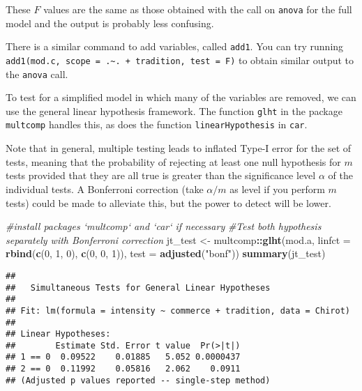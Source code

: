 \documentclass[]{book}
\newenvironment{Shaded}{\begin{snugshade}}{\end{snugshade}}
\newcommand{\CommentTok}[1]{\textcolor[rgb]{0.56,0.35,0.01}{\textit{#1}}}
\newcommand{\DataTypeTok}[1]{\textcolor[rgb]{0.13,0.29,0.53}{#1}}
\newcommand{\DecValTok}[1]{\textcolor[rgb]{0.00,0.00,0.81}{#1}}
\newcommand{\KeywordTok}[1]{\textcolor[rgb]{0.13,0.29,0.53}{\textbf{#1}}}
\newcommand{\NormalTok}[1]{#1}
\newcommand{\OperatorTok}[1]{\textcolor[rgb]{0.81,0.36,0.00}{\textbf{#1}}}
\newcommand{\StringTok}[1]{\textcolor[rgb]{0.31,0.60,0.02}{#1}}
\theoremstyle{definition}
\theoremstyle{definition}
\theoremstyle{definition}
\theoremstyle{remark}
\begin{document}
These \(F\) values are the same as those obtained with the call on \texttt{anova} for the full model and the output is probably less confusing.

There is a similar command to add variables, called \texttt{add1}. You can try running \texttt{add1(mod.c,\ scope\ =\ .\textasciitilde{}.\ +\ tradition,\ test\ =\ \textquotesingle{}F\textquotesingle{})} to obtain similar output to the \texttt{anova} call.

To test for a simplified model in which many of the variables are removed, we can use the general linear hypothesis framework. The function \texttt{glht} in the package \texttt{multcomp} handles this, as does the function \texttt{linearHypothesis} in \texttt{car}.

Note that in general, multiple testing leads to inflated Type-I error for the set of tests, meaning that the probability of rejecting at least one null hypothesis for \(m\) tests provided that they are all true is greater than the significance level \(\alpha\) of the individual tests. A Bonferroni correction (take \(\alpha/m\) as level if you perform \(m\) tests) could be made to alleviate this, but the power to detect will be lower.

\begin{Shaded}
\begin{Highlighting}[]
\CommentTok{#install packages `multcomp` and `car` if necessary}
\CommentTok{#Test both hypothesis separately with Bonferroni correction}
\NormalTok{jt_test <-}\StringTok{ }\NormalTok{multcomp}\OperatorTok{::}\KeywordTok{glht}\NormalTok{(mod.a, }\DataTypeTok{linfct =} \KeywordTok{rbind}\NormalTok{(}\KeywordTok{c}\NormalTok{(}\DecValTok{0}\NormalTok{, }\DecValTok{1}\NormalTok{, }\DecValTok{0}\NormalTok{), }\KeywordTok{c}\NormalTok{(}\DecValTok{0}\NormalTok{, }\DecValTok{0}\NormalTok{, }\DecValTok{1}\NormalTok{)), }
                          \DataTypeTok{test =} \KeywordTok{adjusted}\NormalTok{(}\StringTok{"bonf"}\NormalTok{))}
\KeywordTok{summary}\NormalTok{(jt_test)}
\end{Highlighting}
\end{Shaded}

\begin{verbatim}
## 
##   Simultaneous Tests for General Linear Hypotheses
## 
## Fit: lm(formula = intensity ~ commerce + tradition, data = Chirot)
## 
## Linear Hypotheses:
##        Estimate Std. Error t value  Pr(>|t|)
## 1 == 0  0.09522    0.01885   5.052 0.0000437
## 2 == 0  0.11992    0.05816   2.062    0.0911
## (Adjusted p values reported -- single-step method)
\end{verbatim}
\end{document}
